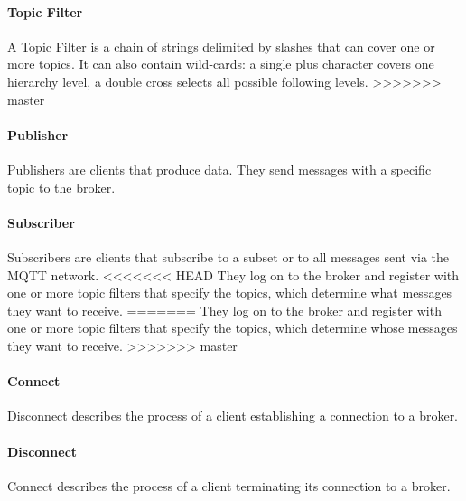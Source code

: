 \paragraph{Topic Filter}
A Topic Filter is a chain of strings delimited by slashes that 
can cover one or more topics. 
It can also contain wild-cards: a single plus character covers one hierarchy level, a double cross selects all possible following levels.
>>>>>>> master
\paragraph{Publisher}
Publishers are clients that produce data.
They send messages with a specific topic to the broker.
\paragraph{Subscriber}
Subscribers are clients that subscribe to a subset or to all messages sent via the
MQTT network.
<<<<<<< HEAD
They log on to the broker and register with one or more topic filters that specify the topics, which determine what messages they want to receive.
=======
They log on to the broker and register with one or more topic filters that specify the topics, which determine whose messages they want to receive.
>>>>>>> master
\paragraph{Connect}
Disconnect describes the process of a client establishing a connection to a broker.
\paragraph{Disconnect}
Connect describes the process of a client terminating its connection to a broker.



